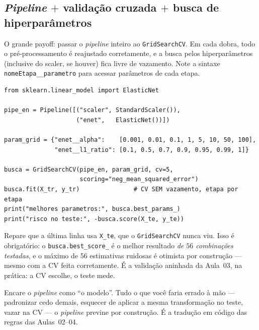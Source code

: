 \documentclass[11pt,a4paper]{article}
\begin{document}
\subsection{\emph{Pipeline} $+$ validação cruzada $+$ busca de hiperparâmetros}
O grande payoff: passar o \emph{pipeline} inteiro ao \texttt{GridSearchCV}. Em cada
dobra, todo o pré-processamento é reajustado corretamente, e a busca pelos
hiperparâmetros (inclusive do scaler, se houver) fica livre de vazamento. Note a
sintaxe \texttt{nomeEtapa\_\_parametro} para acessar parâmetros de cada etapa.

\begin{lstlisting}
from sklearn.linear_model import ElasticNet

pipe_en = Pipeline([("scaler", StandardScaler()),
                    ("enet",   ElasticNet())])

param_grid = {"enet__alpha":    [0.001, 0.01, 0.1, 1, 5, 10, 50, 100],
              "enet__l1_ratio": [0.1, 0.5, 0.7, 0.9, 0.95, 0.99, 1]}

busca = GridSearchCV(pipe_en, param_grid, cv=5,
                     scoring="neg_mean_squared_error")
busca.fit(X_tr, y_tr)               # CV SEM vazamento, etapa por etapa
print("melhores parametros:", busca.best_params_)
print("risco no teste:", -busca.score(X_te, y_te))
\end{lstlisting}

\begin{atencao}
Repare que a última linha usa \texttt{X\_te}, que o \texttt{GridSearchCV} nunca
viu. Isso é obrigatório: o \texttt{busca.best\_score\_} é o melhor resultado
\emph{de $56$ combinações testadas}, e o máximo de 56 estimativas ruidosas é
otimista por construção --- mesmo com a CV feita corretamente. É a validação
aninhada da Aula~03, na prática: a CV escolhe, o teste mede.
\end{atencao}

\begin{ideia}
Encare o \emph{pipeline} como ``o modelo''. Tudo o que você faria errado à mão ---
padronizar cedo demais, esquecer de aplicar a mesma transformação no teste, vazar
na CV --- o \emph{pipeline} previne por construção. É a tradução em código das regras
das Aulas~02--04.
\end{ideia}

\end{document}
